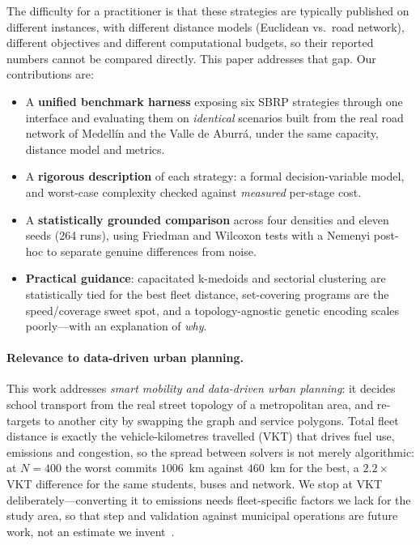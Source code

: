 \documentclass[runningheads]{llncs}
\begin{document}
The difficulty for a practitioner is that these strategies are
typically published on different instances, with different distance
models (Euclidean vs.\ road network), different objectives and
different computational budgets, so their reported numbers cannot be
compared directly. This paper addresses that gap. Our contributions
are:

\begin{itemize}
\item A \textbf{unified benchmark harness} exposing six SBRP strategies
through one interface and evaluating them on \emph{identical} scenarios
built from the real road network of Medell\'in and the Valle de
Aburr\'a, under the same capacity, distance model and metrics.
\item A \textbf{rigorous description} of each strategy: a formal
decision-variable model, and worst-case complexity checked against
\emph{measured} per-stage cost.
\item A \textbf{statistically grounded comparison} across four densities
and eleven seeds (264 runs), using Friedman and Wilcoxon tests with a
Nemenyi post-hoc to separate genuine differences from noise.
\item \textbf{Practical guidance}: capacitated k-medoids and sectorial
clustering are statistically tied for the best fleet distance,
set-covering programs are the speed/coverage sweet spot, and a
topology-agnostic genetic encoding scales poorly---with an explanation
of \emph{why}.
\end{itemize}

\paragraph{Relevance to data-driven urban planning.}
This work addresses \emph{smart mobility and data-driven urban
planning}: it decides school transport from the real street topology of a
metropolitan area, and re-targets to another city by swapping the graph
and service polygons. Total fleet distance is exactly the
vehicle-kilometres travelled (VKT) that drives fuel use, emissions and
congestion, so the spread between solvers is not merely algorithmic: at
$N=400$ the worst commits $1006$~km against $460$~km for the best, a
$2.2\times$ VKT difference for the same students, buses and network. We
stop at VKT deliberately---converting it to emissions needs
fleet-specific factors we lack for the study area, so that step and
validation against municipal operations are future work, not an estimate
we invent~\cite{Sabet2022GreenVRP}.
\end{document}
